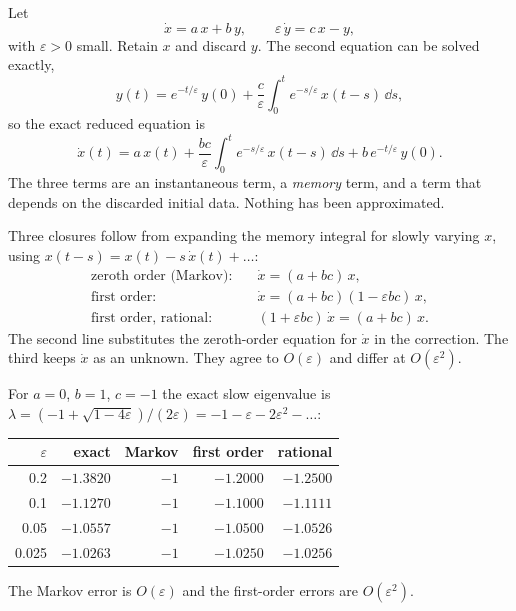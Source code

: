\begin{example}
\label{ex:fastslow}
Let
\begin{equation}
  \dot x = a\,x + b\,y, \qquad
  \varepsilon\,\dot y = c\,x - y ,
  \label{eq:fastslow}
\end{equation}
with $\varepsilon>0$ small. Retain $x$ and discard $y$. The second equation
can be solved exactly,
\[
  y(t) = e^{-t/\varepsilon}\,y(0)
       + \frac{c}{\varepsilon}\int_0^t e^{-s/\varepsilon}\,x(t-s)\,\dd s ,
\]
so the exact reduced equation is
\begin{equation}
  \dot x(t) = a\,x(t)
   + \frac{bc}{\varepsilon}\int_0^t e^{-s/\varepsilon}\,x(t-s)\,\dd s
   + b\,e^{-t/\varepsilon}\,y(0) .
  \label{eq:fastslow-exact}
\end{equation}
The three terms are an instantaneous term, a \emph{memory} term, and a term
that depends on the discarded initial data. Nothing has been approximated.

Three closures follow from expanding the memory integral for slowly varying
$x$, using $x(t-s) = x(t) - s\,\dot x(t) + \dots$:
\begin{align}
  \text{zeroth order (Markov):}\quad & \dot x = (a+bc)\,x, \nonumber\\
  \text{first order:}\quad & \dot x = (a+bc)(1-\varepsilon bc)\,x, \\
  \text{first order, rational:}\quad
     & (1+\varepsilon bc)\,\dot x = (a+bc)\,x . \nonumber
\end{align}
The second line substitutes the zeroth-order equation for $\dot x$ in the
correction. The third keeps $\dot x$ as an unknown. They agree to
$O(\varepsilon)$ and differ at $O(\varepsilon^2)$.

For $a=0$, $b=1$, $c=-1$ the exact slow eigenvalue is
$\lambda = (-1+\sqrt{1-4\varepsilon})/(2\varepsilon)
= -1-\varepsilon-2\varepsilon^2-\dots$:
\begin{center}
\begin{tabular}{rrrrr}
\toprule
$\varepsilon$ & exact & Markov & first order & rational \\
\midrule
0.2   & $-1.3820$ & $-1$ & $-1.2000$ & $-1.2500$ \\
0.1   & $-1.1270$ & $-1$ & $-1.1000$ & $-1.1111$ \\
0.05  & $-1.0557$ & $-1$ & $-1.0500$ & $-1.0526$ \\
0.025 & $-1.0263$ & $-1$ & $-1.0250$ & $-1.0256$ \\
\bottomrule
\end{tabular}
\end{center}
The Markov error is $O(\varepsilon)$ and the first-order errors are
$O(\varepsilon^2)$.
\end{example}

